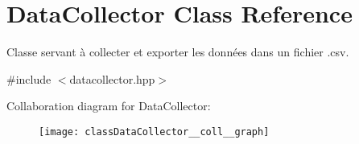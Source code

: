 \hypertarget{classDataCollector}{}\section{Data\+Collector Class Reference}
\label{classDataCollector}


Classe servant à collecter et exporter les données dans un fichier .csv.  




{\ttfamily \#include $<$datacollector.\+hpp$>$}



Collaboration diagram for Data\+Collector\+:\nopagebreak
\begin{figure}[H]
\begin{center}
\leavevmode
\texttt{[image: classDataCollector\_\_coll\_\_graph]}
\end{center}
\end{figure}
